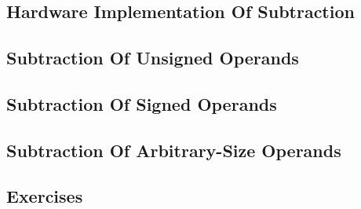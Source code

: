 \chapter{\csubzerolongtitle{}}

\label{csub0}

\section{Hardware Implementation Of Subtraction}

\section{Subtraction Of Unsigned Operands}

\section{Subtraction Of Signed Operands}

\section{Subtraction Of Arbitrary-Size Operands}

\section{Exercises}



